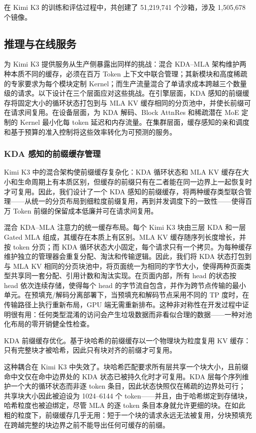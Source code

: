\documentclass[
  10
]{article}
\begin{document}
在 Kimi K3 的训练和评估过程中，共创建了 51,219,741 个沙箱，涉及 1,505,678 个镜像。

\subsection{推理与在线服务}\label{inference-and-online-serving}

为 Kimi K3 提供服务从生产侧暴露出同样的挑战：混合 KDA--MLA 架构维护两种本质不同的缓存，必须在百万 Token 上下文中联合管理；其新模块和高度稀疏的专家要求为每个模块定制 Kernel；而生产流量混合了单请求成本跨越三个数量级的请求。以下设计在三个层面应对这些挑战。在引擎层面，KDA 感知的前缀缓存将固定大小的循环状态打包到与 MLA KV 缓存相同的分页池中，并使长前缀可在请求间复用。在设备层面，为 KDA 解码、Block AttnRes 和稀疏潜在 MoE 定制的 Kernel 最小化每 token 延迟和内存流量。在集群层面，缓存感知的亲和调度和基于预算的准入控制将这些效率转化为可预测的服务。

\subsubsection{KDA 感知的前缀缓存管理}\label{kda-aware-prefix-cache-management}

Kimi K3 中的混合架构使前缀缓存复杂化：KDA 循环状态和 MLA KV 缓存在大小和生命周期上有本质区别，但缓存的前缀只有在二者能在同一边界上一起恢复时才可复用。因此，我们设计了一个 KDA 感知的前缀缓存，将两种缓存类型联合管理——从统一的分页布局到细粒度前缀复用，再到并发调度下的一致性——使得百万 Token 前缀的保留成本低廉并可在请求间复用。

混合 KDA--MLA 注意力的统一缓存布局。每个 Kimi K3 块由三层 KDA 和一层 Gated MLA 组成，其缓存在本质上有区别。MLA KV 缓存随序列长度增长，并按 token 分页；而 KDA 循环状态大小固定，每个请求只有一个拷贝。为每种缓存维护独立的管理器会重复分配、淘汰和传输逻辑。因此，我们将 KDA 状态打包到与 MLA KV 相同的分页块池中，将页面统一为相同的字节大小，使得两种页面类型共享同一套分配、引用计数和淘汰实现。在页面内部，所有 head 的状态按 head 依次连续存储，使得每个 head 的字节流自包含，并作为跨节点传输的最小单元。在预填充/解码分离部署下，当预填充和解码节点采用不同的 TP 度时，在传输路径上执行重新布局，GPU 端无需重新排布。这种非对称性在开发过程中证明很有用：任何类型混淆的访问会产生垃圾数据而非看似合理的数据——一种对池化布局的零开销健全性检查。

KDA 前缀缓存优化。基于块哈希的前缀缓存以一个物理块为粒度复用 KV 缓存：只有完整块才被哈希，因此只有块对齐的前缀才可复用。

这种耦合在 Kimi K3 中失效了。块哈希匹配要求所有层共享一个块大小，且前缀命中文仅在命中边界处的 KDA 状态已被持久化时才可复用。KDA 层每个序列维护一个大的循环状态而非逐 token 条目，因此状态快照仅在稀疏的边界处可行；共享块大小因此被迫设为 1024--6144 个 token——并且，由于哈希绑定到存储块，哈希粒度也被迫绑定，尽管 MLA 的逐 token 条目本身就允许更细的块。在如此粗的粒度下，前缀缓存几乎无用：短于一个块的请求永远无法被复用，分块预填充在跨越完整的块边界之前不能导出任何可缓存的前缀。
\end{document}

